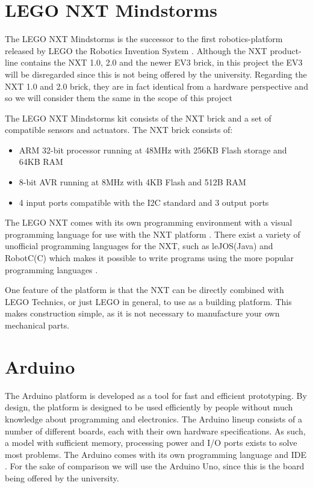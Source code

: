 \section{LEGO NXT Mindstorms}
The LEGO NXT Mindstorms is the successor to the first robotics-platform released
by LEGO the Robotics Invention System \citep{NXTHistory}. Although the NXT
product-line contains the NXT 1.0, 2.0 and the newer EV3 brick, in this project
the EV3 will be disregarded since this is not being offered by the university.
Regarding the NXT 1.0 and 2.0 brick, they are in fact identical from a hardware
perspective and so we will consider them the same in the scope of this project
\citep{NXTversions}\nl

The LEGO NXT Mindstorms kit consists of the NXT brick and a set of
compatible sensors and actuators. The NXT brick \citep[P.3]{NXTStatsV2} consists
of:

\begin{itemize}
  \item ARM 32-bit processor running at 48MHz with 256KB Flash storage and 64KB RAM
  \item 8-bit AVR running at 8MHz with 4KB Flash and 512B RAM
  \item 4 input ports compatible with the I2C standard and 3 output ports
\end{itemize}

The LEGO NXT comes with its own programming environment with a visual
programming language for use with the NXT platform \cite{NXTG}. There exist a
variety of unofficial programming languages for the NXT, such as leJOS(Java) and
RobotC(C) which makes it possible to write programs using the more popular programming
languages \citep{NXTProgrammingLanguage}.\nl

One feature of the platform is that the NXT can be directly combined with
LEGO Technics, or just LEGO in general, to use as a building platform. This
makes construction simple, as it is not necessary to manufacture your own
mechanical parts.

\section{Arduino}
The Arduino platform is developed as a tool for fast and efficient prototyping.
By design, the platform is designed to be used efficiently by people without
much knowledge about programming and electronics. The Arduino lineup consists of
a number of different boards, each with their own hardware specifications.
As such, a model with sufficient memory, processing power and I/O
ports exists to solve most problems. The Arduino comes with its own programming
language and IDE \citep{ArduinoIntro}. For the sake of comparison we will use the Arduino Uno,
since this is the board being offered by the university.\nl

